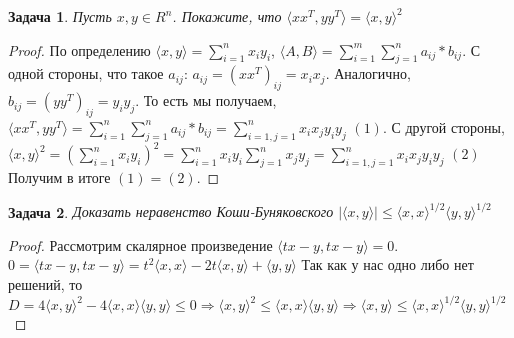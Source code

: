 \documentclass[a4paper]{article}
\newtheorem{problem}{Задача}
\begin{document}
\begin{problem}
Пусть $x, y \in R^n$. Покажите, что $\langle x x^T, y y^T\rangle = \langle x, y\rangle^2$
\end{problem}
\begin{proof}
По определению $\langle x,y \rangle = \sum _{i=1}^n x_i y_i$, $\langle A,B \rangle = \sum _{i=1}^m \sum_{j=1}^n a_{i j} * b_{i j}$.
\newline С одной стороны, что такое $a_{i j}$: $a_{i j} = (xx^T)_{i j} = x_i x_j$. Аналогично, $b_{i j} = (y y^T)_{i j} = y_i y_j$. То есть мы получаем, $\langle xx^T, y y^T \rangle = \sum _{i=1}^n \sum_{j=1}^n a_{i j} * b_{i j} = \sum _{i=1, j = 1}^n x_i x_j y_i y_j$ $(1)$.
\newline С другой стороны, $\langle x, y\rangle^2 = (\sum _{i=1}^n x_i y_i)^2 = \sum _{i=1}^n x_i y_i \sum _{j=1}^n x_j y_j = \sum _{i=1, j = 1}^n x_i x_j y_i y_j$ $(2)$
\newline Получим в итоге $(1) = (2)$.
\end{proof}

\begin{problem} Доказать неравенство Коши-Буняковского $|\langle x, y\rangle| \leq \langle x, x\rangle^{1/2} \langle y, y\rangle^{1/2} $
\end{problem}
\begin{proof}
Рассмотрим скалярное произведение $\langle t x-y, t x-y\rangle = 0$.
\newline $0 = \langle t x-y, t x-y\rangle = t^2 \langle x, x \rangle - 2t\langle x, y \rangle + \langle y, y \rangle$ Так как у нас одно либо нет решений, то $D = 4\langle x, y \rangle^2 - 4\langle x, x \rangle\langle y, y \rangle \leq 0 \Rightarrow \langle x, y \rangle^2 \leq\langle x, x \rangle\langle y, y \rangle \Rightarrow \langle x, y \rangle \leq\langle x, x \rangle^{1/2} \langle y, y \rangle^{1/2}$
\end{proof}
\end{document}
